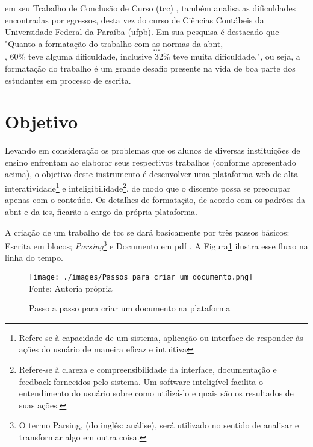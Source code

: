 \clearpage

\cite{santos}
em seu Trabalho de Conclusão de Curso
(\acrshort{tcc})
, também analisa as
dificuldades encontradas por egressos, desta vez do curso de Ciências Contábeis da
Universidade Federal da Paraíba
(\acrshort{ufpb}).
Em sua pesquisa é destacado que "Quanto a
formatação do trabalho com as normas da 
\acrshort{abnt}, \[...\], 60\% teve alguma dificuldade, inclusive
32\% teve muita dificuldade.", ou seja, a formatação do trabalho é um grande desafio presente
na vida de boa parte dos estudantes em processo de escrita.

\section{Objetivo}

Levando em consideração os problemas que os alunos de diversas instituições de ensino enfrentam ao elaborar seus respectivos
trabalhos (conforme apresentado acima), o objetivo deste instrumento é desenvolver uma plataforma web de alta
interatividade\footnote{Refere-se à capacidade de um sistema, aplicação ou interface de responder
        às ações do usuário de maneira eficaz e intuitiva}
e
inteligibilidade\footnote{Refere-se à clareza e compreensibilidade da interface, documentação e feedback fornecidos pelo
    sistema. Um software inteligível facilita o entendimento do usuário sobre como utilizá-lo e quais são os resultados de suas ações.},
de modo que o discente possa se preocupar apenas com o conteúdo. Os detalhes de formatação, de acordo com os padrões da
\acrshort{abnt}
e da
\acrshort{ies},
ficarão a cargo da própria plataforma.

A criação de um trabalho de
\acrshort{tcc}
se dará basicamente por três passos básicos: Escrita em blocos;
\textit{Parsing}\footnote{O termo Parsing, (do inglês: análise), será utilizado no
sentido de analisar e transformar algo em outra coisa.}
e
Documento em
\acrshort{pdf}
. A Figura\ref{fig:Passos para criar um documento} ilustra esse fluxo na linha do tempo.

\begin{figure}[H]
    \centering
    \caption{Passo a passo para criar um documento na plataforma}
    \texttt{[image: ./images/Passos para criar um documento.png]}
    \label{fig:Passos para criar um documento} \\
    \textnormal{\fontsize{10pt}{12pt}Fonte: Autoria própria}
\end{figure}

